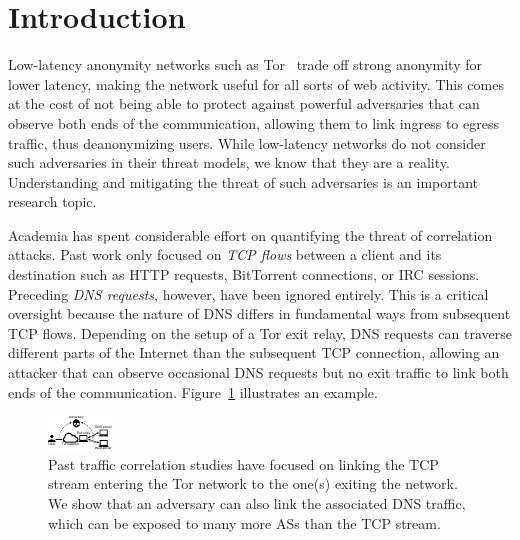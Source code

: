 \section{Introduction}
\label{sec:introduction}

Low-latency anonymity networks such as Tor~\cite{Dingledine2004a} trade off
strong anonymity for lower latency, making the network useful for all sorts of
web activity.  This comes at the cost of not being able to protect against
powerful adversaries that can observe both ends of the communication, allowing
them to link ingress to egress traffic, thus deanonymizing users.  While
low-latency networks do not consider such adversaries in their threat models,
we know that they are a reality.  Understanding and mitigating the threat of
such adversaries is an important research topic.

Academia has spent considerable effort on quantifying the threat of correlation
attacks.  Past work only focused on \emph{TCP flows} between a client and its
destination such as HTTP requests, BitTorrent connections, or IRC sessions.
Preceding \emph{DNS requests}, however, have been ignored entirely.  This is a
critical oversight because the nature of DNS differs in fundamental ways from
subsequent TCP flows.  Depending on the setup of a Tor exit relay, DNS requests
can traverse different parts of the Internet than the subsequent TCP
connection, allowing an attacker that can observe occasional DNS requests but
no exit traffic to link both ends of the communication.
Figure~\ref{fig:overview} illustrates an example.

\begin{figure}[t]
	\centering
	\includegraphics[width=0.7\linewidth]{figures/attack-concept.pdf}
	\caption{Past traffic correlation studies have focused on linking the TCP
		stream entering the Tor network to the one(s) exiting the network.  We
		show that an adversary can also link the associated DNS traffic, which
		can be exposed to many more ASs than the TCP stream.}
	\label{fig:overview}
\end{figure}


